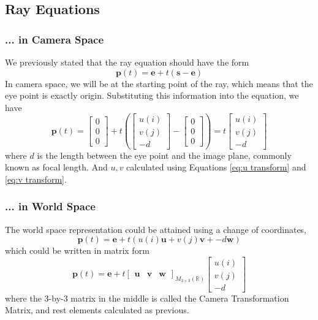 \documentclass[11pt]{article}
\newcommand{\be}{\mathbf{e}}
\newcommand{\bp}{\mathbf{p}}
\newcommand{\bs}{\mathbf{s}}
\newcommand{\bu}{\mathbf{u}}
\newcommand{\bv}{\mathbf{v}}
\newcommand{\bw}{\mathbf{w}}
\newcommand{\real}{\mathbb{R}}
\begin{document}
\subsection{Ray Equations}
\subsubsection{... in Camera Space}
We previously stated that the ray equation should have the form 
\begin{equation}
	\bp(t) = \be + t(\bs - \be)
\end{equation}
In camera space, we will be at the starting point of the ray, which means that the eye point is exactly origin. Substituting this information into the equation, we have
\begin{equation}
	\mathbf{p}(t)=\left[\begin{array}{l}
		0 \\
		0 \\
		0
		\end{array}\right]+t\left(\left[\begin{array}{l}
		u(i) \\
		v(j) \\
		-d
		\end{array}\right]-\left[\begin{array}{l}
		0 \\
		0 \\
		0
	\end{array}\right]\right) = t\begin{bmatrix}
		u(i) \\ v(j) \\ -d
	\end{bmatrix}
\end{equation}
where $d$ is the length between the eye point and the image plane, commonly known as focal length. And $u, v$ calculated using Equations \ref{eq:u transform} and \ref{eq:v transform}. 

\subsubsection{... in World Space}
The world space representation could be attained using a change of coordinates, 
\begin{equation}
	\mathbf{p}(t)=\mathbf{e}+t(u(i) \mathbf{u}+v(j) \mathbf{v}+-d \mathbf{w}) 
\end{equation}
which could be written in matrix form 
\begin{equation}
	\bp(t) = \be + t \begin{bmatrix}
		\bu & \bv & \bw
	\end{bmatrix}_{M_{3 \times 3}(\real)} \begin{bmatrix}
		u(i) \\ v(j) \\-d
	\end{bmatrix}
\end{equation}
where the 3-by-3 matrix in the middle is called the Camera Transformation Matrix, and rest elements calculated as previous. 
\end{document}
